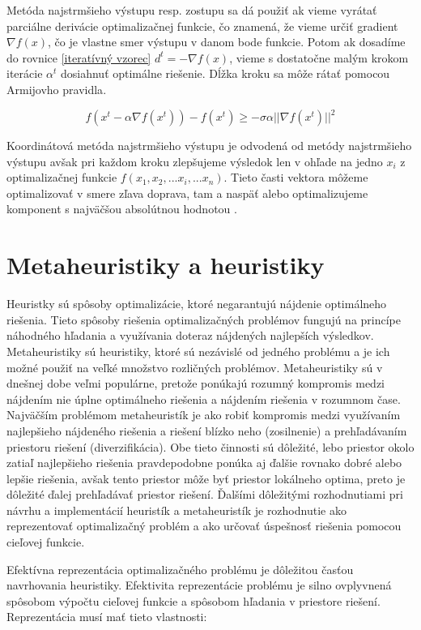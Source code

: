 Metóda najstrmšieho výstupu resp. zostupu sa dá použiť ak vieme vyrátať parciálne derivácie optimalizačnej funkcie, čo znamená, že vieme určiť gradient \(\nabla f(x) \), čo je vlastne smer výstupu v danom bode funkcie. Potom ak dosadíme do rovnice \ref{iteratívný vzorec} \(d^t = -\nabla f(x)\), vieme s dostatočne malým krokom iterácie \(\alpha^t\) dosiahnuť optimálne riešenie. Dĺžka kroku sa môže rátať pomocou Armijovho pravidla\cite{2}.

\begin{equation}
 f(x^t - \alpha \nabla f(x^t)) - f(x^t) ≥ −\sigma \alpha ||\nabla f(x^t)||^2
\end{equation}

Koordinátová metóda najstrmšieho výstupu je odvodená od metódy najstrmšieho výstupu avšak pri každom kroku zlepšujeme výsledok len v ohľade na jedno \(x_i\) z optimalizačnej funkcie \(f(x_1, x_2, ... x_i, ... x_n)\). Tieto časti vektora môžeme optimalizovať v smere zľava doprava, tam a naspäť alebo optimalizujeme komponent s najväčšou absolútnou hodnotou
\cite{3}.

\section{Metaheuristiky a heuristiky}\label{Metaheuristiky a heuristiky}
Heuristky sú spôsoby optimalizácie, ktoré negarantujú nájdenie optimálneho riešenia. Tieto spôsoby riešenia optimalizačných problémov fungujú na princípe náhodného hľadania a využívania doteraz nájdených najlepších výsledkov. Metaheuristiky sú heuristiky, ktoré sú nezávislé od jedného problému a je ich možné použiť na veľké množstvo rozličných problémov. Metaheuristiky sú v dnešnej dobe veľmi populárne, pretože ponúkajú rozumný kompromis medzi nájdením nie úplne optimálneho riešenia a nájdením riešenia v rozumnom čase. Najväčším problémom metaheuristík je ako robiť kompromis medzi využívaním najlepšieho nájdeného riešenia a riešení blízko neho (zosilnenie) a prehľadávaním priestoru riešení (diverzifikácia). Obe tieto činnosti sú dôležité, lebo priestor okolo zatiaľ najlepšieho riešenia pravdepodobne ponúka aj ďalšie rovnako dobré alebo lepšie riešenia, avšak tento priestor môže byť priestor lokálneho optima, preto je dôležité ďalej prehľadávať priestor riešení. Ďalšími dôležitými rozhodnutiami pri návrhu a implementácií heuristík a metaheuristík je rozhodnutie ako reprezentovať optimalizačný problém a ako určovať úspešnosť riešenia pomocou cieľovej funkcie.

Efektívna reprezentácia optimalizačného problému je dôležitou časťou navrhovania heuristiky. Efektivita reprezentácie problému je silno ovplyvnená spôsobom výpočtu cieľovej funkcie a spôsobom hľadania v priestore riešení. Reprezentácia musí mať tieto vlastnosti:

